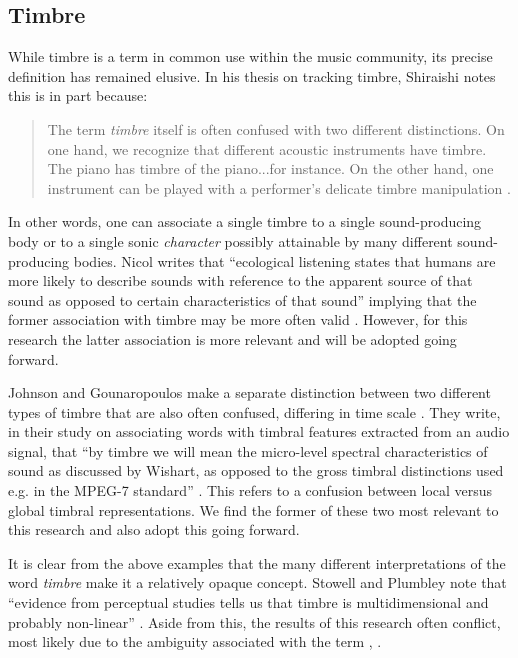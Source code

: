 \documentclass[12pt]{report} 	%
\numberwithin{figure}{chapter}
\numberwithin{table}{chapter}
\numberwithin{equation}{chapter}
\begin{document}
\begin{flushleft}
\section{Timbre}
While timbre is a term in common use within the music community, its precise definition has remained elusive. In his thesis on tracking timbre, Shiraishi notes this is in part because:
\begin{singlespace}
\selectfont
\begin{quote}
The term \textit{timbre} itself is often confused with two different distinctions. On one hand, we recognize that different acoustic instruments have timbre. The piano has timbre of the piano...for instance. On the other hand, one instrument can be played with a performer's delicate timbre manipulation \cite[p. 4]{Shiraishi:2006ye}.
\end{quote}
\end{singlespace}
\selectfont
In other words, one can associate a single timbre to a single sound-producing body or to a single sonic \textit{character} possibly attainable by many different sound-producing bodies. Nicol writes that ``ecological listening states that humans are more likely to describe sounds with reference to the apparent source of that sound as opposed to certain characteristics of that sound'' implying that the former association with timbre may be more often valid \cite[p. 23]{Nicol:2005rp}. However, for this research the latter association is more relevant and will be adopted going forward. 

Johnson and Gounaropoulos make a separate distinction between two different types of timbre that are also often confused, differing in time scale \cite{Johnson:2006pi}. They write, in their study on associating words with timbral features extracted from an audio signal, that ``by timbre we will mean the micro-level spectral characteristics of sound as discussed by Wishart, as opposed to the gross timbral distinctions used e.g. in the MPEG-7 standard'' \cite[p. 1]{Johnson:2006pi}. This refers to a confusion between local versus global timbral representations. We find the former of these two most relevant to this research and also adopt this going forward.

It is clear from the above examples that the many different interpretations of the word \textit{timbre} make it a relatively opaque concept. Stowell and Plumbley note that ``evidence from perceptual studies tells us that timbre is multidimensional and probably non-linear'' \cite[p. 1]{Stowell:2008qf}. Aside from this, the results of this research often conflict, most likely due to the ambiguity associated with the term \cite[p. 4]{Fiebrink:os}, \cite[p. 11]{Ciglar:2009uf}.


\end{flushleft}
\end{document}
